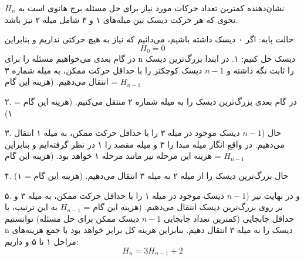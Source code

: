 \p
$H_n$ نشان‌دهنده کمترین تعداد حرکات مورد نیاز برای حل مسئله برج هانوی است به نحوی که هر حرکت دیسک بین میله‌های ۱ و ۳ شامل میله ۲ نیز باشد.

حالت پایه: اگر ۰ دیسک داشته باشیم، می‌دانیم که نیاز به هیچ حرکتی نداریم و بنابراین:
\bigbreak
$$ H_{0} = 0 $$
\bigbreak
در گام بعدی می‌خواهیم مسئله را برای n دیسک حل کنیم:
\bigbreak
۱. در ابتدا بزرگ‌ترین دیسک را ثابت نگه داشته و $n-1$ دیسک کوچکتر را با حداقل حرکت ممکن، به میله شماره ۳ انتقال می‌دهیم. (هزینه این گام = $H_{n-1}$

۲. در گام بعدی بزرگ‌ترین دیسک را به میله شماره ۲ منتقل می‌کنیم. (هزینه این گام = ۱)

۳. حال ($n-1$ دیسک موجود در میله ۳ را با حداقل حرکت ممکن، به میله ۱ انتقال می‌دهیم. در واقع انگار میله مبدا را ۳ و میله مقصد را ۱ در نظر گرفته‌ایم و بنابراین هزینه این مرحله نیز مانند مرحله ۱ خواهد بود. (هزینه این گام = $H_{n-1}$

۴. حال بزرگ‌ترین دیسک را از میله ۲ به میله ۳ انتقال می‌دهیم. (هزینه این گام = ۱)

۵. و در نهایت نیز ($n-1$ دیسک موجود در میله ۱ را با حداقل حرکت ممکن، به میله ۳ و بر روی بزرگ‌ترین دیسک انتقال می‌دهیم. (هزینه  این گام = $H_{n-1}$
\bigbreak
به این ترتیب، با حداقل جابجایی (کمترین تعداد جابجایی $n-1$ دیسک ممکن برای حل مسئله) توانستیم n دیسک را به میله ۳ انتقال دهیم. بنابراین هزینه کل برابر خواهد بود با جمع هزینه‌های مراحل ۱ تا ۵ و داریم:
\bigbreak
$$H_{n} = 3H_{n-1} + 2$$
\bigbreak
